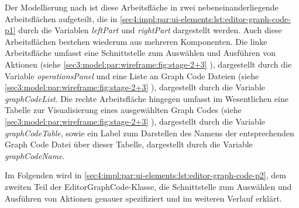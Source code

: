 

Der Modellierung nach ist diese Arbeitsfläche in zwei nebeneinanderliegende Arbeitsflächen aufgeteilt, die in \cref{sec4:impl:par:ui-elements:lst:editor-graph-code-p1} durch die Variablen \textit{leftPart} und \textit{rightPart} dargestellt werden.
Auch diese Arbeitsflächen bestehen wiederum aus mehreren Komponenten.
Die linke Arbeitsfläche umfasst eine Schnittstelle zum Auswählen und Ausführen von Aktionen (siehe \cref{sec3:model:par:wireframe:fig:stage-2+3} ), dargestellt durch die Variable \textit{operationsPanel} und eine Liste an Graph Code Dateien (siehe \cref{sec3:model:par:wireframe:fig:stage-2+3} ), dargestellt durch die Variable \textit{graphCodeList}.
Die rechte Arbeitsfläche hingegen umfasst im Wesentlichen eine Tabelle zur Visualisierung eines ausgewählten Graph Codes (siehe \cref{sec3:model:par:wireframe:fig:stage-2+3} ), dargestellt durch die Variable \textit{graphCodeTable}, sowie ein Label zum Darstellen des Namens der entsprechenden Graph Code Datei über dieser Tabelle, dargestellt durch die Variable \textit{graphCodeName}.

Im Folgenden wird in \cref{sec4:impl:par:ui-elements:lst:editor-graph-code-p2}, dem zweiten Teil der EditorGraphCode-Klasse, die Schnittstelle  zum Auswählen und Ausführen von Aktionen genauer spezifiziert und im weiteren Verlauf erklärt.






